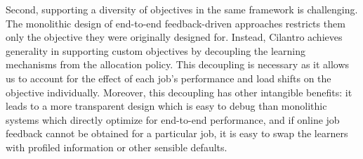 Second, supporting a diversity of objectives in the same framework is challenging. The monolithic
design of end-to-end feedback-driven approaches\cite{zhang2021sinan, kalavri2018three,
qiu2020firm} restricts them only the objective they were originally designed for.
Instead, Cilantro achieves generality in
supporting custom objectives by decoupling the learning mechanisms from the allocation policy.
This decoupling is necessary as it allows us to account for the effect of each job's performance and
load shifts on the objective individually.
Moreover, this decoupling has other intangible benefits:
it leads to a more transparent design which is easy to debug than monolithic
systems which directly  optimize for end-to-end performance,
and if online job feedback cannot be obtained for a particular job, it is easy to swap the learners
with profiled information or other sensible defaults.
 



